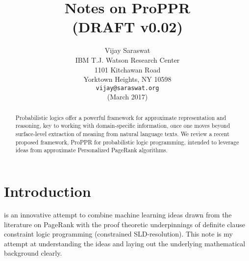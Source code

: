 \documentclass{article} %
\newcommand{\keywords}[1]{\par\addvspace\baselineskip
\noindent\keywordname\enspace\ignorespaces#1}
\begin{document}
%

\long{}
\def\mtimes{}
\def\LL#1{#1}
\title{Notes on ProPPR \\
{\small (DRAFT v0.02)}}
\author{
Vijay Saraswat \\
IBM T.J. Watson Research Center\\
1101 Kitchawan Road\\
Yorktown Heights, NY 10598 \\
\texttt{vijay@saraswat.org} \\
(March 2017)
}

\newcommand{\fix}{\marginpar{FIX}}
\newcommand{\new}{\marginpar{NEW}}

\nipsfinalcopy %

\maketitle

\begin{abstract}
Probabilistic logics offer a powerful framework for approximate representation and reasoning, key to working with domain-specific information, once one moves beyond surface-level extraction of meaning from natural language texts.
We review a recent proposed framework, ProPPR \cite{Cohen-2015} for probabilistic logic programming, intended to leverage ideas from approximate Personalized PageRank algorithms.
\end{abstract}

\def\Or{\vee}
\def\And{\wedge}
\def\Arrow{\rightarrow}
\def\Xor{\;\mbox{xor}\;}
\def\Ind{\;\mbox{Ind}}
\def\pr{\mbox{\em pr}}
\def\apr{\mbox{apr}}
\def\APR{\mbox{ApproxPageRank}}
\def\push{\mbox{\em push}}
\def\vol{\mbox{\em vol}}
\def\Supp{\mbox{\em Supp}}
\def\True{\mbox{\tt true}}
\def\Fail{\mbox{\tt false}}
\def\var{\mbox{\em var}}
\def\tuple#1{\langle#1\rangle}

\section{Introduction}
\cite{Cohen-2015} is an innovative attempt to combine machine learning ideas drawn from the literature on PageRank with the proof theoretic underpinnings of definite clause constraint logic programming (constrained SLD-resolution). This note is my attempt at understanding the ideas and laying out the underlying mathematical background clearly.
\end{document}
